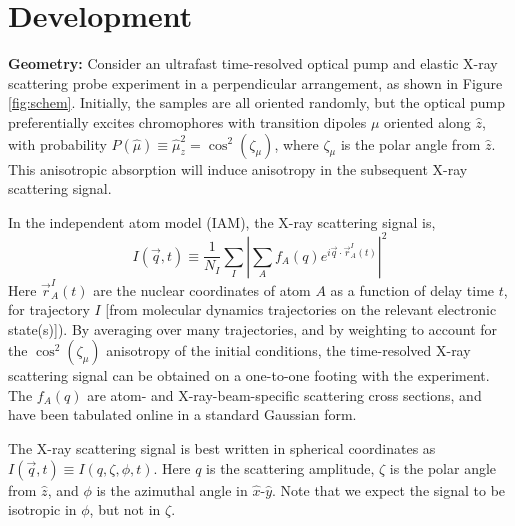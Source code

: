 \documentclass[fleqn,oneside,12pt]{article}
\date{}
\begin{document}

\section{Development}

\textbf{Geometry:} Consider an ultrafast time-resolved optical pump and elastic
X-ray scattering probe experiment in a perpendicular arrangement, as shown in
Figure \ref{fig:schem}. Initially, the samples are all oriented randomly, but
the optical pump preferentially excites chromophores with transition dipoles
$\mu$ oriented along $\hat z$, with probability $P (\hat \mu) \equiv \hat
\mu_z^2 = \cos^2 (\zeta_{\mu})$, where $\zeta_{\mu}$ is the polar angle from
$\hat z$.  This anisotropic absorption will induce anisotropy in the subsequent
X-ray scattering signal.

In the independent atom model (IAM), the X-ray scattering signal is,
\[
I (\vec q, t)
\equiv
\frac{1}{N_I}
\sum_{I}
\left |
\sum_{A}
f_{A} (q)
e^{i \vec q \cdot \vec r_A^I (t)}
\right |^2
\]
Here $\vec r_A^I (t)$ are the nuclear coordinates of atom $A$ as a function of
delay time $t$, for trajectory $I$ [from molecular dynamics trajectories on the
relevant electronic state(s)]). By averaging over many trajectories, and by
weighting to account for the $\cos^2 (\zeta_{\mu})$ anisotropy of the initial
conditions, the time-resolved X-ray scattering signal can be obtained on a
one-to-one footing with the experiment. The $f_A (q)$ are atom- and
X-ray-beam-specific scattering cross sections, and have been tabulated online in
a standard Gaussian form.

The X-ray scattering signal is best written in spherical coordinates as $I(\vec
q, t) \equiv I(q, \zeta, \phi, t)$. Here $q$ is the scattering amplitude,
$\zeta$ is the polar angle from $\hat z$, and $\phi$ is the azimuthal angle in
$\hat x$-$\hat y$. Note that we expect the signal to be isotropic in $\phi$, but
not in $\zeta$. 
\end{document}
